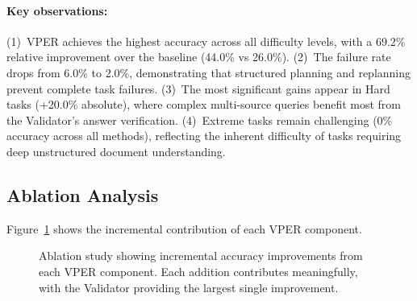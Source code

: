 \documentclass{article}
\begin{document}
\paragraph{Key observations:}
(1)~VPER achieves the highest accuracy across all difficulty levels, with a 69.2\% relative improvement over the baseline (44.0\% vs 26.0\%).
(2)~The failure rate drops from 6.0\% to 2.0\%, demonstrating that structured planning and replanning prevent complete task failures.
(3)~The most significant gains appear in Hard tasks (+20.0\% absolute), where complex multi-source queries benefit most from the Validator's answer verification.
(4)~Extreme tasks remain challenging (0\% accuracy across all methods), reflecting the inherent difficulty of tasks requiring deep unstructured document understanding.

\subsection{Ablation Analysis}

Figure~\ref{fig:ablation} shows the incremental contribution of each VPER component.

\begin{figure}[t]
\centering
{}
\caption{Ablation study showing incremental accuracy improvements from each VPER component. Each addition contributes meaningfully, with the Validator providing the largest single improvement.}
\label{fig:ablation}
\end{figure}
\end{document}
